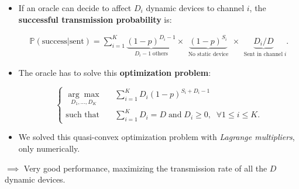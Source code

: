 \begin{frameO}

    \begin{itemize}\tightlist
        \item
              If an oracle can decide to affect \(D_i\) dynamic devices to channel
              \(i\), the \textbf{successful transmission probability} is:
              \vspace*{-10pt}

              \begin{small} \begin{align*}
                      \mathbb{P}(\text{success}|\text{sent}) = \sum_{i=1}^{K} \underbrace{(1 - p)^{D_i - 1}}_{\;\;D_i - 1 \;\text{others}\;\;} \times \underbrace{(1 - p)^{S_i}}_{\;\;\text{No static device}\;\;} \times \underbrace{ D_i / D }_{\;\;\text{Sent in channel}\; i}.
                  \end{align*} \end{small}
        \pause
        \item
              The oracle has to solve this \textbf{optimization problem}:
              \vspace*{-5pt}

              \begin{small} \begin{equation*} \begin{cases}
                          \underset{D_1,\dots,D_{K}}{\arg\max}\;\;\; & \sum_{i=1}^{K} D_i (1 - p)^{S_i + D_i -1}                                             \\
                          \text{such that}\;\;\;                       & \sum_{i=1}^{K} D_i = D \; \text{and} \; D_i \geq 0, \; \; \forall 1 \leq i \leq K .
                      \end{cases} \end{equation*} \end{small}
        \item
              We solved this quasi-convex optimization problem with \emph{Lagrange
                  multipliers}, only numerically.
    \end{itemize}

    \(\implies\) Very good performance, maximizing the transmission rate
    of all the \(D\) dynamic devices.

\end{frameO}

